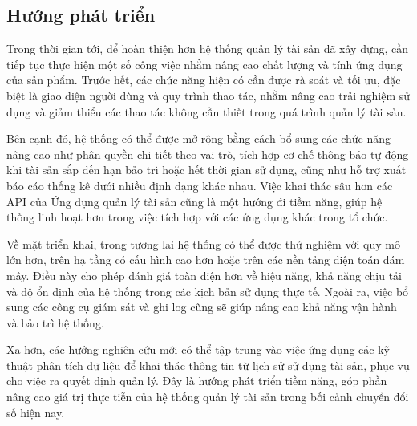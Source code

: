 \documentclass[../DoAn.tex]{subfiles}
\begin{document}
\subsection{Hướng phát triển}

Trong thời gian tới, để hoàn thiện hơn hệ thống quản lý tài sản đã xây dựng, cần tiếp tục thực hiện một số công việc nhằm nâng cao chất lượng và tính ứng dụng của sản phẩm. Trước hết, các chức năng hiện có cần được rà soát và tối ưu, đặc biệt là giao diện người dùng và quy trình thao tác, nhằm nâng cao trải nghiệm sử dụng và giảm thiểu các thao tác không cần thiết trong quá trình quản lý tài sản.

Bên cạnh đó, hệ thống có thể được mở rộng bằng cách bổ sung các chức năng nâng cao như phân quyền chi tiết theo vai trò, tích hợp cơ chế thông báo tự động khi tài sản sắp đến hạn bảo trì hoặc hết thời gian sử dụng, cũng như hỗ trợ xuất báo cáo thống kê dưới nhiều định dạng khác nhau. Việc khai thác sâu hơn các API của Ứng dụng quản lý tài sản cũng là một hướng đi tiềm năng, giúp hệ thống linh hoạt hơn trong việc tích hợp với các ứng dụng khác trong tổ chức.

Về mặt triển khai, trong tương lai hệ thống có thể được thử nghiệm với quy mô lớn hơn, trên hạ tầng có cấu hình cao hơn hoặc trên các nền tảng điện toán đám mây. Điều này cho phép đánh giá toàn diện hơn về hiệu năng, khả năng chịu tải và độ ổn định của hệ thống trong các kịch bản sử dụng thực tế. Ngoài ra, việc bổ sung các công cụ giám sát và ghi log cũng sẽ giúp nâng cao khả năng vận hành và bảo trì hệ thống.

Xa hơn, các hướng nghiên cứu mới có thể tập trung vào việc ứng dụng các kỹ thuật phân tích dữ liệu để khai thác thông tin từ lịch sử sử dụng tài sản, phục vụ cho việc ra quyết định quản lý. Đây là hướng phát triển tiềm năng, góp phần nâng cao giá trị thực tiễn của hệ thống quản lý tài sản trong bối cảnh chuyển đổi số hiện nay.
\end{document}
